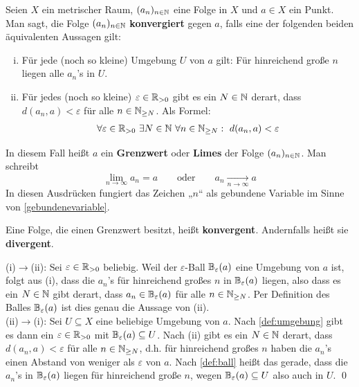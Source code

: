 \begin{defin}[Folgenkonvergenz] \label{def:konvergenz}    
    Seien $X$ ein metrischer Raum, $(a_n)_{n\in \mathbb N}$ eine Folge in $X$ und $a\in X$ ein Punkt. Man sagt, die Folge $(a_n)_{n\in \mathbb N}$ \textbf{konvergiert} gegen $a$, falls eine der folgenden beiden äquivalenten Aussagen gilt:
    \begin{enumerate}[(i)]
        \item Für jede (noch so kleine) Umgebung $U$ von $a$ gilt: Für hinreichend große $n$ liegen alle $a_n$'s in $U$.
        \item Für jedes (noch so kleine) $\varepsilon \in \mathbb R_{>0}$ gibt es ein $N\in \mathbb N$ derart, dass $d(a_n,a)<\varepsilon$ für alle $n\in \mathbb N_{\ge N}$. Als Formel:
        \begin{align*}
            \forall\varepsilon\in \mathbb R_{>0}\ \exists N\in\mathbb N\ \forall n\in \mathbb N_{\ge N}:\ d(a_n,a)<\varepsilon
        \end{align*}
    \end{enumerate}
    In diesem Fall heißt $a$ ein \textbf{Grenzwert} oder \textbf{Limes} der Folge $(a_n)_{n\in \mathbb N}$. Man schreibt
        \[ \lim_{n\to\infty}a_n=a \qquad\text{oder}\qquad a_n\xrightarrow[n\to \infty]{} a \]
    In diesen Ausdrücken fungiert das Zeichen „$n$“ als gebundene Variable im Sinne von \cref{gebundenevariable}.

    Eine Folge, die einen Grenzwert besitzt, heißt \textbf{konvergent}. Andernfalls heißt sie \textbf{divergent}.
\end{defin}


\begin{bew}[*]
    (i)$\to$(ii): Sei $\varepsilon\in \mathbb R_{> 0}$ beliebig. Weil der $\varepsilon$-Ball $\mathbb B_\varepsilon(a)$ eine Umgebung von $a$ ist, folgt aus (i), dass die $a_n$'s für hinreichend großes $n$ in $\mathbb B_\varepsilon(a)$ liegen, also dass es ein $N\in \mathbb N$ gibt derart, dass $a_n\in \mathbb B_\varepsilon(a)$ für alle $n\in \mathbb N_{\ge N}$. Per Definition des Balles $\mathbb B_\varepsilon(a)$ ist dies genau die Aussage von (ii). \\[0.5em]
    (ii)$\to$(i): Sei $U\subseteq X$ eine beliebige Umgebung von $a$. Nach \cref{def:umgebung} gibt es dann ein $\varepsilon\in \mathbb R_{>0}$ mit $\mathbb B_\varepsilon(a)\subseteq U$. Nach (ii) gibt es ein $N\in \mathbb N$ derart, dass $d(a_n,a)<\varepsilon$ für alle $n\in \mathbb N_{\ge N}$, d.h. für hinreichend großes $n$ haben die $a_n$'s einen Abstand von weniger als $\varepsilon$ von $a$. Nach \cref{def:ball} heißt das gerade, dass die $a_n$'s in $\mathbb B_\varepsilon(a)$ liegen für hinreichend große $n$, wegen $\mathbb B_\varepsilon(a)\subseteq U$ also auch in $U$. \qed
\end{bew}


